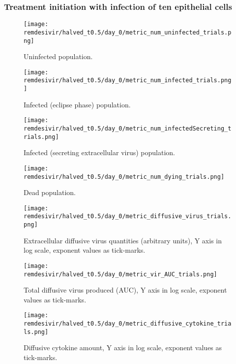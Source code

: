 \subsubsection{Treatment initiation with infection of ten epithelial cells}\label{sup:sec:extra_figures:homo_halved:day0}

\begin{figure}[H]
\texttt{[image: remdesivir/halved\_t0.5/day\_0/metric\_num\_uninfected\_trials.png]}
\caption{Uninfected population.\label{fig:app:homo_halved:day0:uninf}}
\end{figure}

\begin{figure}[H]
\texttt{[image: remdesivir/halved\_t0.5/day\_0/metric\_num\_infected\_trials.png]}
\caption{Infected (eclipse phase) population.\label{fig:app:homo_halved:day0:inf}}
\end{figure}

\begin{figure}[H]
\texttt{[image: remdesivir/halved\_t0.5/day\_0/metric\_num\_infectedSecreting\_trials.png]}
\caption{Infected (secreting extracellular virus) population.\label{fig:app:homo_halved:day0:infSecr}}
\end{figure}

\begin{figure}[H]
\texttt{[image: remdesivir/halved\_t0.5/day\_0/metric\_num\_dying\_trials.png]}
\caption{Dead population.\label{fig:app:homo_halved:day0:dead}}
\end{figure}

\begin{figure}[H]
\texttt{[image: remdesivir/halved\_t0.5/day\_0/metric\_diffusive\_virus\_trials.png]}
\caption{Extracellular diffusive virus quantities (arbitrary units), Y axis in log scale, exponent values as tick-marks.\label{fig:app:homo_halved:day0:diff_vir}}
\end{figure}


\begin{figure}[H]
\texttt{[image: remdesivir/halved\_t0.5/day\_0/metric\_vir\_AUC\_trials.png]}
\caption{Total diffusive virus produced (AUC), Y axis in log scale, exponent values as tick-marks.\label{fig:app:homo_halved:day0:auc_vir}}
\end{figure}

\begin{figure}[H]
\texttt{[image: remdesivir/halved\_t0.5/day\_0/metric\_diffusive\_cytokine\_trials.png]}
\caption{Diffusive cytokine amount, Y axis in log scale, exponent values as tick-marks.\label{fig:app:homo_halved:day0:diff_cyto}}
\end{figure}

